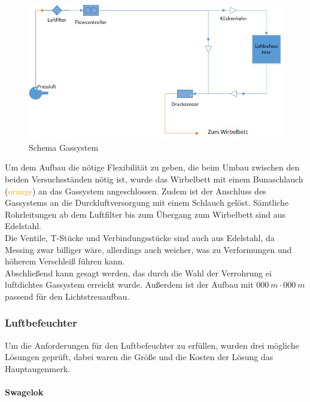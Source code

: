 \begin{figure}[h]
	\begin{center}
		\includegraphics[scale=0.6]{Aufbau_Gassystem.jpg}
		\caption{Schema Gassystem}
	\end{center}
\end{figure}


Um dem Aufbau die nötige Flexibilität zu geben, die beim Umbau zwischen den beiden Versuchsständen nötig ist, wurde das Wirbelbett mit einem Bunaschlauch (\textcolor{orange}{orange}) an das Gassystem angeschlossen. Zudem ist der Anschluss des Gassystems an die Durckluftversorgung mit einem Schlauch gelöst. Sämtliche Rohrleitungen ab dem Luftfilter bis zum Übergang zum Wirbelbett sind aus Edelstahl. \\
Die Ventile, T-Stücke und Verbindungsstücke sind auch aus Edelstahl, da Messing zwar billiger wäre, allerdings auch weicher, was zu Verformungen und höherem Verschleiß führen kann. \\
Abschließend kann gesagt werden, das durch die Wahl der Verrohrung ei luftdichtes Gassystem erreicht wurde. Außerdem ist der Aufbau mit $\SI{000}{m} \cdot \SI{000}{m}$ passend für den Lichtstreuaufbau.


\subsubsection{Luftbefeuchter}

Um die Anforderungen für den Luftbefeuchter zu erfüllen, wurden drei mögliche Lösungen geprüft, dabei waren die Größe und die Kosten der Lösung das Hauptaugenmerk.

\paragraph{Swagelok} 

\hfill \\

